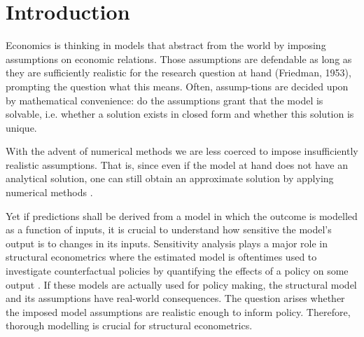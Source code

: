 \section{Introduction} \label{intro}


Economics is thinking in models that abstract from the world by imposing assumptions on economic relations. Those assumptions are defendable as long as they are sufficiently realistic for the research question at hand (Friedman, 1953), prompting the question what this means. Often, assump-tions are decided upon by mathematical convenience: do the assumptions grant that the model is solvable, i.e. whether a solution exists in closed form and whether this solution is unique.



With the advent of numerical methods we are less coerced to impose insufficiently realistic assumptions. That is, since even if the model at hand does not have an analytical solution, one can still obtain an approximate solution by applying numerical methods \citep{MF04}.


Yet if predictions shall be derived from a model in which the outcome is modelled as a function of inputs, it is crucial to understand how sensitive the model’s output is to changes in its inputs. Sensitivity analysis plays a major role in structural econometrics where the estimated model is oftentimes used to investigate counterfactual policies by quantifying the effects of a policy on some output \citep{LM17}. If these models are actually used for policy making, the structural model and its assumptions have real-world consequences. The question arises whether the imposed model assumptions are realistic enough to inform policy. Therefore, thorough modelling is crucial for structural econometrics.

